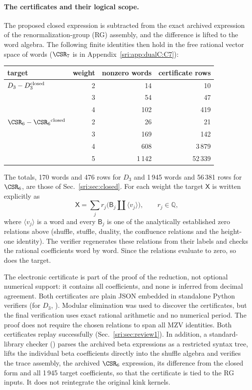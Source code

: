 \paragraph{The certificates and their logical scope.} The proposed closed expression is subtracted from the exact
archived expression of the renormalization-group (RG) assembly, and the difference is lifted to the word algebra. The
following finite identities then hold in the free rational vector space of words ($\CSR_7$ is in
Appendix~\ref{sri:app:dualC:C7}):
\begin{center}\small
\begin{tabular}{@{}lrrr@{}}
\toprule
target & weight & nonzero words & certificate rows\\
\midrule
$D_3-D_3^{\rm closed}$ & 2 & 14 & 10\\
 & 3 & 54 & 47\\
 & 4 & 102 & 419\\
\midrule
$\CSR_6-\CSR_6{}^{\rm closed}$ & 2 & 26 & 21\\
 & 3 & 169 & 142\\
 & 4 & 608 & 3\,879\\
 & 5 & 1\,142 & 52\,339\\
\bottomrule
\end{tabular}
\end{center}
The totals, 170 words and 476 rows for $D_3$ and 1\,945 words and 56\,381 rows for $\CSR_6$, are those of
Sec.~\ref{sri:sec:closed}. For each weight the target $\mathsf X$ is written explicitly as
\begin{equation}
 \mathsf X=\sum_jr_j\bigl(\mathsf B_j\mathbin{\amalg}\langle v_j\rangle\bigr),\qquad r_j\in\mathbb Q,
\end{equation}
where $\langle v_j\rangle$ is a word and every $\mathsf B_j$ is one of the analytically established zero relations
above (shuffle, stuffle, duality, the confluence relations and the height-one identity). The verifier regenerates
these relations from their labels and checks the rational coefficients word by word. Since the relations evaluate to
zero, so does the target.

The electronic certificate is part of the proof of the reduction, not optional numerical support: it contains all coefficients, and
none is inferred from decimal agreement. Both certificates are plain JSON embedded in standalone Python
verifiers (for $D_3$, ). Modular elimination was
used to discover the certificates, but the final verification uses exact rational arithmetic and no numerical period.
The proof does not require the chosen relations to span all MZV identities. Both certificates replay successfully
(Sec.~\ref{sri:sec:review1}). In addition, a standard-library checker
() parses the archived beta
expressions as a restricted syntax tree, lifts the individual beta coefficients directly into the shuffle algebra and
verifies the trace assembly, the archived $\CSR_6$ expression, its difference from the closed form and all 1\,945
target coefficients, so that the certificate is tied to the RG inputs. It does not reintegrate the original kink
kernels.

